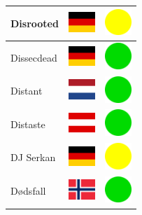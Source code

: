 \documentclass[12pt, a4paper, twoside]{report}
\begin{document}
\begin{center}
\begin{longtable}{|p{5cm}|p{2cm}|p{2cm}|}
 Disrooted                                                  & \includegraphics[width=1cm]{../4x3/de} &   \includegraphics[width=1cm]{../likes/m} \\ \hline
 Dissecdead                                                 & \includegraphics[width=1cm]{../4x3/de} &   \includegraphics[width=1cm]{../likes/y} \\ \hline
 Distant                                                    & \includegraphics[width=1cm]{../4x3/nl} &   \includegraphics[width=1cm]{../likes/y} \\ \hline
 Distaste                                                   & \includegraphics[width=1cm]{../4x3/at} &   \includegraphics[width=1cm]{../likes/y} \\ \hline
 DJ Serkan                                                  & \includegraphics[width=1cm]{../4x3/de} &   \includegraphics[width=1cm]{../likes/m} \\ \hline
 Dødsfall                                                   & \includegraphics[width=1cm]{../4x3/no} &   \includegraphics[width=1cm]{../likes/y} \\ \hline

\end{longtable}
\end{center}
\end{document}
